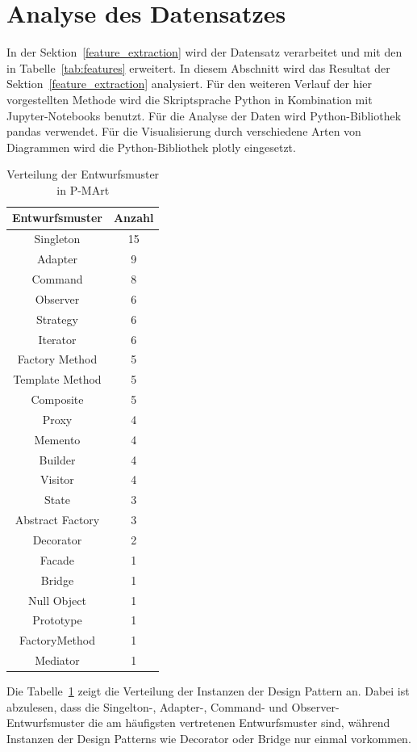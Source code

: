 \section{Analyse des Datensatzes}

In der Sektion~\ref{feature_extraction} wird der Datensatz verarbeitet und mit den in Tabelle~\ref{tab:features} erweitert.
In diesem Abschnitt wird das Resultat der Sektion~\ref{feature_extraction} analysiert.
Für den weiteren Verlauf der hier vorgestellten Methode wird die Skriptsprache Python in Kombination mit Jupyter-Notebooks benutzt. Für die Analyse der Daten wird Python-Bibliothek pandas verwendet. Für die Visualisierung durch verschiedene Arten von Diagrammen wird die Python-Bibliothek plotly eingesetzt.


\begin{table}[h]
    \begin{tabular}{|c|c|}
        \hline
        Entwurfsmuster & Anzahl\\
        \hline
        Singleton&15\\Adapter&9\\Command&8\\Observer&6\\Strategy&6\\Iterator&6\\Factory Method&5\\Template Method&5\\Composite&5\\Proxy&4\\Memento&4\\Builder&4\\Visitor&4\\State&3\\Abstract Factory&3\\Decorator&2\\Facade&1\\Bridge&1\\Null Object&1\\Prototype&1\\FactoryMethod&1\\Mediator&1\\
        \hline
    \end{tabular}
    \caption{Verteilung der Entwurfsmuster in P-MArt}
    \label{tab:dp_dist}
\end{table}



Die Tabelle~\ref{tab:dp_dist} zeigt die Verteilung der Instanzen der Design Pattern an. 
Dabei ist abzulesen, dass die Singelton-, Adapter-, Command- und Observer-Entwurfsmuster die am häufigsten vertretenen Entwurfsmuster sind, während Instanzen der Design Patterns wie Decorator oder Bridge nur einmal vorkommen.

